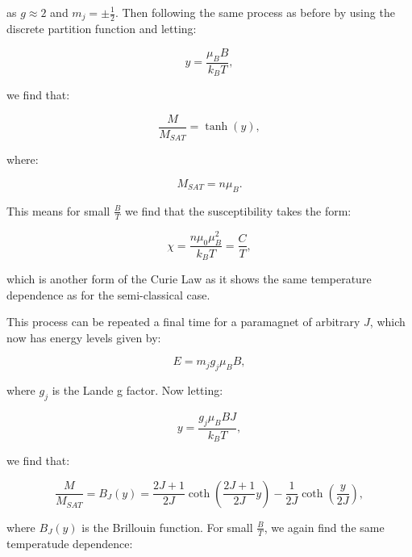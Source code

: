 \noindent as $g\approx2$ and $m_j = \pm\frac{1}{2}$. Then following the same process as before by using the discrete partition function and letting:

\begin{equation}
    y = \frac{\mu_B B}{k_B T},
    \label{QuantumY}
\end{equation}

\noindent we find that:

\begin{equation}
    \frac{M}{M_{SAT}} = \tanh(y),
    \label{QuantumMagnetisation}
\end{equation}

\noindent where:

\begin{equation}
    M_{SAT} = n \mu_B.
    \label{QuantumSaturatedMagnetisation}
\end{equation}

\noindent This means for small $\frac{B}{T}$ we find that the susceptibility takes the form:

\begin{equation}
    \chi = \frac{n \mu_0 \mu_B^2}{k_B T} = \frac{C}{T},
    \label{QuantumSusceptibility}
\end{equation}

\noindent which is another form of the Curie Law as it shows the same temperature dependence as for the semi-classical case.

\noindent This process can be repeated a final time for a paramagnet of arbitrary $J$, which now has energy levels given by:

\begin{equation}
    E = m_j g_j \mu_B B,
    \label{EnergyLevelsArbitraryParamagnet}
\end{equation}

\noindent where $g_j$ is the Lande g factor. Now letting:

\begin{equation}
    y = \frac{g_j \mu_B B J}{k_B T},
    \label{ArbitraryQuantumY}
\end{equation}

\noindent we find that:

\begin{equation}
    \frac{M}{M_{SAT}} = B_J(y) = \frac{2J + 1}{2J}\coth(\frac{2J + 1}{2J}y) - \frac{1}{2J}\coth(\frac{y}{2J}),
    \label{ArbitraryQuantumMagnetisation}
\end{equation}

\noindent where $B_J(y)$ is the Brillouin function. For small $\frac{B}{T}$, we again find the same temperatude dependence:

